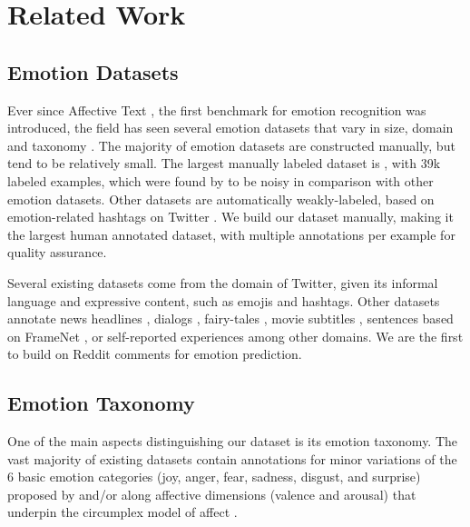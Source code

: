 \documentclass[11pt,a4paper]{article}
\begin{document}
 \section{Related Work}
\label{sec:related_work}

\subsection{Emotion Datasets}
Ever since Affective Text  \citep{affective-text-2007-semeval}, the first benchmark for emotion recognition was introduced, the field has seen several emotion datasets that vary in size, domain and taxonomy  \citep[cf.][]{unified-klinger2018analysis}. The majority of emotion datasets are constructed manually, but tend to be relatively small. 
The largest manually labeled dataset is \citet{crowdflower-2016}, with 39k labeled examples, which were found by \citet{unified-klinger2018analysis} to be noisy in comparison with other emotion datasets. 
Other datasets are automatically weakly-labeled, based on emotion-related hashtags on Twitter \citep{wang2012harnessing, abdul2017emonet}. We build our dataset manually, making it the largest human annotated dataset, with multiple annotations per example for quality assurance.

Several existing datasets come from the domain of Twitter, given its informal language and expressive content, such as emojis and hashtags. Other datasets annotate news headlines \citep{affective-text-2007-semeval}, dialogs \citep{li2017dailydialog}, fairy-tales \citep{alm-etal-2005-emotions}, movie subtitles \citep{ohman2018creating}, sentences based on FrameNet \citep{ghazi2015detecting}, or self-reported experiences \citep{scherer1994evidence} among other domains. We are the first to build on Reddit comments for emotion prediction.





\subsection{Emotion Taxonomy}
\label{ssec:related_work_emotion_taxonomy}
 One of the main aspects distinguishing our dataset is its emotion taxonomy. The vast majority of existing datasets contain annotations for minor variations of the 6 basic emotion categories (joy, anger, fear, sadness, disgust, and surprise) proposed by \citet{ekman1992there} and/or along affective dimensions (valence and arousal) that underpin the circumplex model of affect \cite{russell2003core,buechel2017emobank}. 
 
\end{document}
